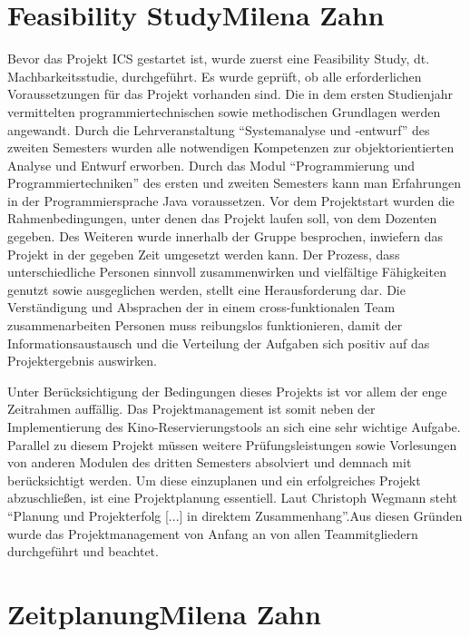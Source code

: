 	\section[Feasibility Study]{Feasibility Study{\hfill \normalsize Milena Zahn}}
	Bevor das Projekt \ac{ICS} gestartet ist, wurde zuerst eine Feasibility Study, dt. Machbarkeitsstudie, durchgeführt. Es wurde geprüft, ob alle erforderlichen Voraussetzungen für das Projekt vorhanden sind. Die in dem ersten Studienjahr vermittelten programmiertechnischen sowie methodischen Grundlagen werden angewandt. Durch die Lehrveranstaltung \enquote{Systemanalyse und -entwurf} des zweiten Semesters wurden alle notwendigen Kompetenzen zur objektorientierten Analyse und Entwurf erworben. Durch das Modul \enquote{Programmierung und Programmiertechniken} des ersten und zweiten Semesters kann man Erfahrungen in der Programmiersprache Java voraussetzen. Vor dem Projektstart wurden die Rahmenbedingungen, unter denen das Projekt laufen soll, von dem Dozenten gegeben. Des Weiteren wurde innerhalb der Gruppe besprochen, inwiefern das Projekt in der gegeben Zeit umgesetzt werden kann. Der Prozess, dass unterschiedliche Personen sinnvoll zusammenwirken und vielfältige Fähigkeiten genutzt sowie ausgeglichen werden, stellt eine Herausforderung dar. Die Verständigung und Absprachen der in einem cross-funktionalen Team zusammenarbeiten Personen muss reibungslos funktionieren, damit der Informationsaustausch und die Verteilung der Aufgaben sich positiv auf das Projektergebnis auswirken.
	
	Unter Berücksichtigung der Bedingungen dieses Projekts ist vor allem der enge Zeitrahmen auffällig. Das Projektmanagement ist somit neben der Implementierung des Kino-Reservierungstools an sich eine sehr wichtige Aufgabe. Parallel zu diesem Projekt müssen weitere Prüfungsleistungen sowie Vorlesungen von anderen Modulen des dritten Semesters absolviert und demnach mit berücksichtigt werden. Um diese einzuplanen und ein erfolgreiches Projekt abzuschließen, ist eine Projektplanung essentiell. Laut Christoph Wegmann steht \enquote{Planung und Projekterfolg [...] in direktem Zusammenhang}\autocite[][S. 73]{projektmanagement}.Aus diesen Gründen wurde das Projektmanagement von Anfang an von allen Teammitgliedern durchgeführt und beachtet.
	
	\section[Zeitplanung]{Zeitplanung{\hfill \normalsize Milena Zahn}} \label{projektplan}
